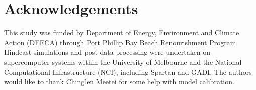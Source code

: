 \documentclass[12pt]{article}
\begin{document}

\newpage
\section*{Acknowledgements}

This study was funded by Department of Energy, Environment and Climate Action (DEECA) through Port Phillip Bay Beach Renourishment Program. Hindcast simulations and post-data processing were undertaken on supercomputer systems within the University of Melbourne and the National Computational Infrastructure (NCI), including Spartan and GADI. The authors would like to thank Chinglen Meetei for some help with model calibration.

\newpage
\printbibliography

\newpage
\end{document}
